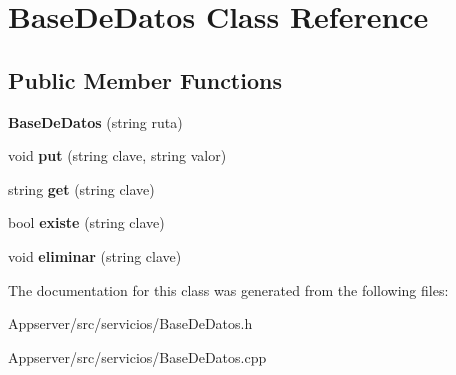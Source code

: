 \hypertarget{classBaseDeDatos}{}\section{Base\+De\+Datos Class Reference}
\label{classBaseDeDatos}
\subsection*{Public Member Functions}
\begin{DoxyCompactItemize}
\item 
{\bfseries Base\+De\+Datos} (string ruta)\hypertarget{classBaseDeDatos_a31d33717618cea590d2dbb412d1ed76b}{}\label{classBaseDeDatos_a31d33717618cea590d2dbb412d1ed76b}

\item 
void {\bfseries put} (string clave, string valor)\hypertarget{classBaseDeDatos_ab3ddf5149897619dadc871fccf484b17}{}\label{classBaseDeDatos_ab3ddf5149897619dadc871fccf484b17}

\item 
string {\bfseries get} (string clave)\hypertarget{classBaseDeDatos_a2303f5c8884f7942ed7b1110924c43ff}{}\label{classBaseDeDatos_a2303f5c8884f7942ed7b1110924c43ff}

\item 
bool {\bfseries existe} (string clave)\hypertarget{classBaseDeDatos_a45d53eb6eb9803e9ef3c6cf8b4a69183}{}\label{classBaseDeDatos_a45d53eb6eb9803e9ef3c6cf8b4a69183}

\item 
void {\bfseries eliminar} (string clave)\hypertarget{classBaseDeDatos_a7c26f9c036a9c5d9b68618f700abc78f}{}\label{classBaseDeDatos_a7c26f9c036a9c5d9b68618f700abc78f}

\end{DoxyCompactItemize}


The documentation for this class was generated from the following files\+:\begin{DoxyCompactItemize}
\item 
Appserver/src/servicios/Base\+De\+Datos.\+h\item 
Appserver/src/servicios/Base\+De\+Datos.\+cpp\end{DoxyCompactItemize}
